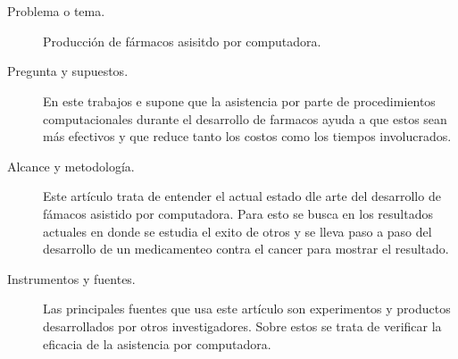 \documentclass[12pt]{beamer}
\begin{document}
\section{\cite{inv 2}}
	\begin{frame}{\cite{inv 2}}
		\begin{description}
			\item[Problema o tema.] Producción de fármacos asisitdo por computadora.
			\item[Pregunta y supuestos.] En este trabajos e supone que la asistencia por parte de procedimientos computacionales durante el desarrollo de farmacos ayuda a que estos sean más efectivos y que reduce tanto los costos como los tiempos involucrados.
		\end{description}
	\end{frame}
	\begin{frame}{\cite{inv 2}}
		\begin{description}
			\item[Alcance y metodología.] Este artículo trata de entender el actual estado dle arte del desarrollo de fámacos asistido por computadora. Para esto se busca en los resultados actuales en donde se estudia el exito de otros y se lleva paso a paso del desarrollo de un medicamenteo contra el cancer para mostrar el resultado.
			\item[Instrumentos y fuentes.] Las principales fuentes que usa este artículo son experimentos y productos desarrollados por otros investigadores. Sobre estos se trata de verificar la eficacia de la asistencia por computadora.
		\end{description}
		
	\end{frame}
\end{document}
